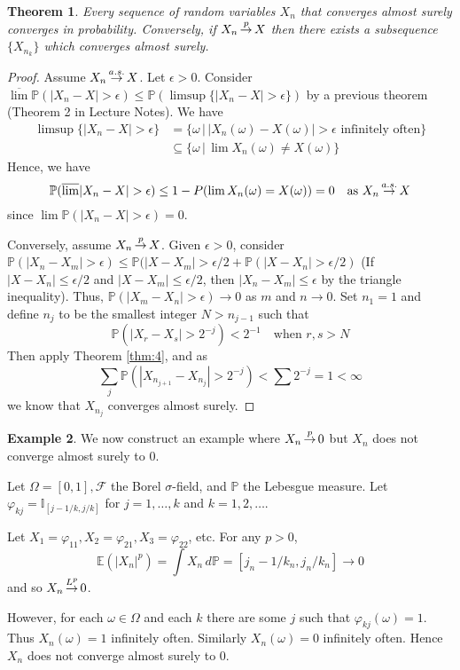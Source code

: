 \documentclass[10pt, oneside, reqno]{amsart}
\theoremstyle{plain}%
\newtheorem{thm}{Theorem}[section]
\theoremstyle{definition}
\newtheorem{exmp}[thm]{Example}
\theoremstyle{remark}
\renewcommand{\phi}{\varphi}
\newcommand{\sigf}{\mathcal{F}}
\newcommand{\E}{\mathbb{E}}
\newcommand{\I}{\mathbb{I}}
\renewcommand{\P}{\mathbb{P}}
\def\cip{\,{\buildrel p \over \rightarrow}\,}
\def\cas{\,{\buildrel a.s. \over \rightarrow}\,}
\def\clp{\,{\buildrel L^p \over \rightarrow}\,}
\begin{document}
\begin{thm}Every sequence of random variables $X_n$ that converges almost surely converges in probability.  Conversely, if $X_n \cip X$ then there exists a subsequence $\{ X_{n_k} \}$ which converges almost surely.  
\end{thm}
\begin{proof}
	Assume $X_n \cas X$.  Let $\epsilon > 0$.  Consider $\overline \lim \P( |X_n - X | > \epsilon) \leq \P( \limsup \{ |X_n - X | > \epsilon \} )$ by a previous theorem (Theorem 2 in Lecture Notes).  We have \begin{align*}
		\limsup \{ | X_n - X | > \epsilon \} &= \{ \omega \, | \, | X_n(\omega) - X(\omega)| > \epsilon \text{ infinitely often} \} \\
											&\subseteq \{ \omega \, | \, \lim X_n (\omega) \neq X(\omega) \}
	\end{align*}
	Hence, we have \[
		\P( \overline \lim | X_n - X | > \epsilon ) \leq 1 - P (\lim X_n(\omega) = X(\omega)) = 0 \quad \text{as $X_n \cas X$}
	\] since $\lim \P( |X_n - X | > \epsilon) = 0$.
	
	Conversely, assume $X_n \cip X$.  Given $\epsilon > 0$, consider $\P(|X_n - X_m | > \epsilon) \leq \P(|X- X_m | > \epsilon/2 + \P( | X- X_n | > \epsilon/2 )$ (If $|X-X_n| \leq \epsilon/2$ and $|X-X_m| \leq \epsilon/2$, then $|X_n - X_m| \leq \epsilon$ by the triangle inequality). 
	Thus, $\P(|X_m - X_n | > \epsilon) \rightarrow 0$ as $m$ and $n \rightarrow 0$.  Set $n_1 = 1$ and define $n_j$ to be the smallest integer $N > n_{j-1}$ such that \[
		\P(|X_r - X_s| > 2^{-j} ) < 2^{-1} \quad \text{when $r, s > N$}
	\]
	Then apply Theorem \ref{thm:4}, and as \[
		\sum_j \P( |X_{n_{j+1}} - X_{n_j} | > 2^{-j}) < \sum 2^{-j} = 1 < \infty
	\] we know that $X_{n_j}$ converges almost surely.
	
\end{proof}
\begin{exmp}\label{exmp:cip_does_not_imply_as}
	We now construct an example where $X_n \cip 0$ but $X_n$ does not converge almost surely to $0$.  

	Let $\Omega = [0,1], \sigf$ the Borel $\sigma$-field, and $\P$ the Lebesgue measure.  Let $\phi_{kj} = \I_{[j-1/k, j/k]}$ for $j = 1, \dots, k$ and $k = 1, 2, \dots$.  

	Let $X_1 = \phi_{11}, X_2 = \phi_{21}, X_3 = \phi_{22}$, etc.  For any $p > 0$, \[
		\E(|X_n|^p) = \int X_n \, d\P = [ j_n - 1/k_n, j_n/k_n] \rightarrow 0
	\] and so $X_n \clp 0$.
	
	However, for each $\omega \in \Omega$ and each $k$ there are some $j$ such that $\phi_{kj}(\omega) = 1$.  Thus $X_n(\omega) = 1$ infinitely often. Similarly $X_n(\omega) = 0$ infinitely often.  Hence $X_n$ does not converge almost surely to 0.
\end{exmp}
\end{document}
